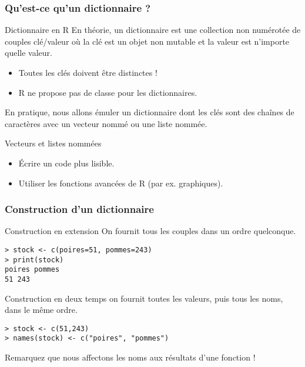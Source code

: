 \documentclass[10pt]{beamer}
\begin{document}
\begin{frame}
  \frametitle{Qu'est-ce qu'un dictionnaire ?}

  \begin{alertblock}{Dictionnaire en R}
    En théorie, un dictionnaire est une collection non numérotée de couples clé/valeur où la clé est un objet non mutable et la valeur est n'importe quelle valeur.
    \begin{itemize}
    \item Toutes les clés doivent être distinctes !
    \item R ne propose pas de classe pour les dictionnaires.
    \end{itemize}
    En pratique, nous allons \alert{émuler un dictionnaire} dont les clés sont des chaînes de caractères avec un \alert{vecteur nommé} ou une \alert{liste nommée}.  
  \end{alertblock}

  \begin{block}{Vecteurs et listes nommées}
    \begin{itemize}
    \item Écrire un code plus lisible.
    \item Utiliser les fonctions avancées de R (par ex. graphiques).
    \end{itemize}

  \end{block}
\end{frame}


\begin{frame}[fragile]
  \frametitle{Construction d'un dictionnaire}

\begin{block}{Construction en extension}
  On fournit tous les couples dans un ordre quelconque.
    \begin{lstlisting}[style=block]
> stock <- c(poires=51, pommes=243)
> print(stock)
poires pommes
51 243      
\end{lstlisting}
  \end{block}

  \begin{block}{Construction en deux temps}
    on fournit toutes les valeurs, puis tous les noms, dans le même ordre.
    \begin{lstlisting}[style=block]
> stock <- c(51,243)
> names(stock) <- c("poires", "pommes")
\end{lstlisting}
Remarquez que nous affectons les noms aux résultats d'une fonction !
\end{block}
\end{frame}
\end{document}

